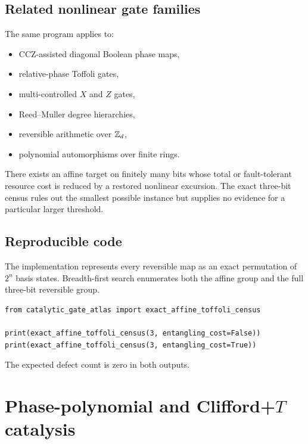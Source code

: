 \subsection{Related nonlinear gate families}
The same program applies to:
\begin{itemize}
\item CCZ-assisted diagonal Boolean phase maps,
\item relative-phase Toffoli gates,
\item multi-controlled $X$ and $Z$ gates,
\item Reed--Muller degree hierarchies,
\item reversible arithmetic over $\mathbb Z_d$,
\item polynomial automorphisms over finite rings.
\end{itemize}

\begin{conjecturebox}
There exists an affine target on finitely many bits whose total or fault-tolerant resource cost is reduced by a restored nonlinear excursion.  The exact three-bit census rules out the smallest possible instance but supplies no evidence for a particular larger threshold.
\end{conjecturebox}

\subsection{Reproducible code}
The implementation represents every reversible map as an exact permutation of $2^n$ basis states.  Breadth-first search enumerates both the affine group and the full three-bit reversible group.

\begin{lstlisting}[style=pythonstyle,caption={Exact three-bit affine-versus-Toffoli census.}]
from catalytic_gate_atlas import exact_affine_toffoli_census

print(exact_affine_toffoli_census(3, entangling_cost=False))
print(exact_affine_toffoli_census(3, entangling_cost=True))
\end{lstlisting}
The expected defect count is zero in both outputs.

\section{Phase-polynomial and Clifford+\texorpdfstring{$T$}{T} catalysis}\label{g:ch:phase-cliffordt}


